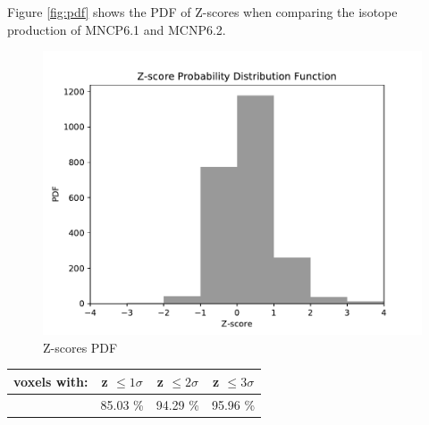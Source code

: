 Figure \ref{fig:pdf} shows the PDF of Z-scores when comparing 
the isotope production of MNCP6.1 and MCNP6.2. 
\begin{figure}[h!]
        \centering
        \includegraphics[scale=0.4]{figs/PDF.pdf}
        \caption{Z-scores PDF }
        \label{fig:reldiff}
\end{figure}


\begin{center}
\begin{tabular}{ |c|c|c|c|}
 \hline
 voxels with: & z $\leq 1 \sigma$ & z $\leq 2 \sigma$ & z $\leq 3 \sigma$ \\
 \hline \hline
              & 85.03 \%          & 94.29 \%          & 95.96 \%           \\
 \hline
\end{tabular}
\end{center}

